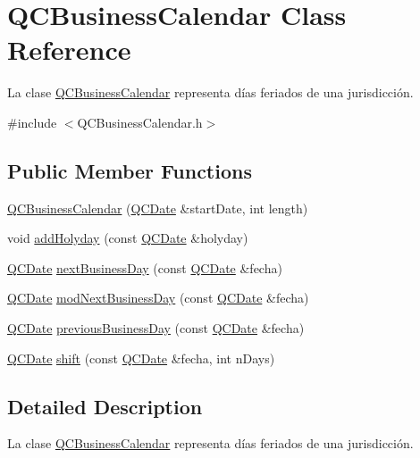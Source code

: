 \hypertarget{class_q_c_business_calendar}{\section{Q\+C\+Business\+Calendar Class Reference}
\label{class_q_c_business_calendar}
}


La clase \hyperlink{class_q_c_business_calendar}{Q\+C\+Business\+Calendar} representa días feriados de una jurisdicción.  




{\ttfamily \#include $<$Q\+C\+Business\+Calendar.\+h$>$}

\subsection*{Public Member Functions}
\begin{DoxyCompactItemize}
\item 
\hyperlink{class_q_c_business_calendar_a4460142026e84efab275be4712c366f8}{Q\+C\+Business\+Calendar} (\hyperlink{class_q_c_date}{Q\+C\+Date} \&start\+Date, int length)
\item 
void \hyperlink{class_q_c_business_calendar_ab72834f0e628a1f903bcb4a32c22f346}{add\+Holyday} (const \hyperlink{class_q_c_date}{Q\+C\+Date} \&holyday)
\item 
\hyperlink{class_q_c_date}{Q\+C\+Date} \hyperlink{class_q_c_business_calendar_a5608f57e89472291cfdea26685b6eea6}{next\+Business\+Day} (const \hyperlink{class_q_c_date}{Q\+C\+Date} \&fecha)
\item 
\hyperlink{class_q_c_date}{Q\+C\+Date} \hyperlink{class_q_c_business_calendar_a83697d6856882aff5d315884bcdd8ed8}{mod\+Next\+Business\+Day} (const \hyperlink{class_q_c_date}{Q\+C\+Date} \&fecha)
\item 
\hyperlink{class_q_c_date}{Q\+C\+Date} \hyperlink{class_q_c_business_calendar_a90b4ba160b7a61818da7eb1e76305c6d}{previous\+Business\+Day} (const \hyperlink{class_q_c_date}{Q\+C\+Date} \&fecha)
\item 
\hyperlink{class_q_c_date}{Q\+C\+Date} \hyperlink{class_q_c_business_calendar_a7d5760e3664caa8b963d340998551ac5}{shift} (const \hyperlink{class_q_c_date}{Q\+C\+Date} \&fecha, int n\+Days)
\end{DoxyCompactItemize}


\subsection{Detailed Description}
La clase \hyperlink{class_q_c_business_calendar}{Q\+C\+Business\+Calendar} representa días feriados de una jurisdicción. 

